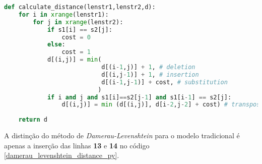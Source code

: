 \begin{lstlisting}[language=Python,label=damerau_levenshtein_distance_py,caption={Implementação da distância de Damerau-Levenshtein}]
def calculate_distance(lenstr1,lenstr2,d):
    for i in xrange(lenstr1):
        for j in xrange(lenstr2):
            if s1[i] == s2[j]:
                cost = 0
            else:
                cost = 1
            d[(i,j)] = min(
                           d[(i-1,j)] + 1, # deletion
                           d[(i,j-1)] + 1, # insertion
                           d[(i-1,j-1)] + cost, # substitution
                          )
            if i and j and s1[i]==s2[j-1] and s1[i-1] == s2[j]:
                d[(i,j)] = min (d[(i,j)], d[i-2,j-2] + cost) # transposition
 
    return d
\end{lstlisting}

A distinção do método de \textit{Damerau-Levenshtein} para o modelo tradicional é apenas a inserção das linhas \textbf{13} e \textbf{14} no código \ref{damerau_levenshtein_distance_py}.

